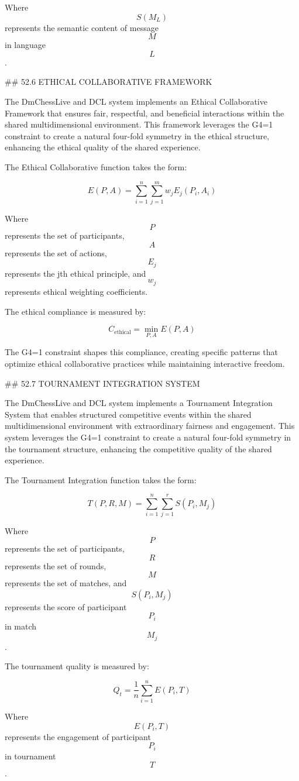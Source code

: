 Where $$ S(M_{L}) $$ represents the semantic content of message $$ M $$ in language $$ L $$.

## 52.6 ETHICAL COLLABORATIVE FRAMEWORK

The DmChessLive and DCL system implements an Ethical Collaborative Framework that ensures fair, respectful, and beneficial interactions within the shared multidimensional environment. This framework leverages the G4=1 constraint to create a natural four-fold symmetry in the ethical structure, enhancing the ethical quality of the shared experience.

The Ethical Collaborative function takes the form:

$$ E(P, A) = \sum_{i=1}^{n} \sum_{j=1}^{m} w_j E_j(P_i, A_i) $$

Where $$ P $$ represents the set of participants, $$ A $$ represents the set of actions, $$ E_j $$ represents the jth ethical principle, and $$ w_j $$ represents ethical weighting coefficients.

The ethical compliance is measured by:

$$ C_{\text{ethical}} = \min_{P, A} E(P, A) $$

The G4=1 constraint shapes this compliance, creating specific patterns that optimize ethical collaborative practices while maintaining interactive freedom.

## 52.7 TOURNAMENT INTEGRATION SYSTEM

The DmChessLive and DCL system implements a Tournament Integration System that enables structured competitive events within the shared multidimensional environment with extraordinary fairness and engagement. This system leverages the G4=1 constraint to create a natural four-fold symmetry in the tournament structure, enhancing the competitive quality of the shared experience.

The Tournament Integration function takes the form:

$$ T(P, R, M) = \sum_{i=1}^{n} \sum_{j=1}^{r} S(P_i, M_j) $$

Where $$ P $$ represents the set of participants, $$ R $$ represents the set of rounds, $$ M $$ represents the set of matches, and $$ S(P_i, M_j) $$ represents the score of participant $$ P_i $$ in match $$ M_j $$.

The tournament quality is measured by:

$$ Q_t = \frac{1}{n} \sum_{i=1}^{n} E(P_i, T) $$

Where $$ E(P_i, T) $$ represents the engagement of participant $$ P_i $$ in tournament $$ T $$.

